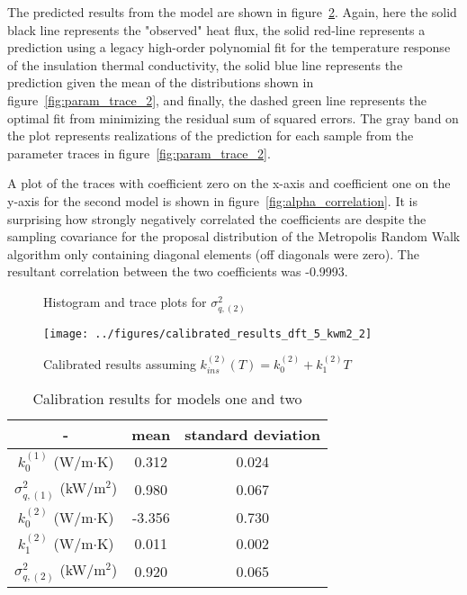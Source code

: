 \documentclass[article]{proc}
\begin{document}
        The predicted results from the model are shown in figure~\ref{fig:cal_results_2}. Again, here the solid black line represents the "observed" heat flux, the solid red-line represents a prediction using a legacy high-order polynomial fit for the temperature response of the insulation thermal conductivity, the solid blue line represents the prediction given the mean of the distributions shown in figure~\ref{fig:param_trace_2}, and finally, the dashed green line represents the optimal fit from minimizing the residual sum of squared errors. The gray band on the plot represents realizations of the prediction for each sample from the parameter traces in figure~\ref{fig:param_trace_2}.

        A plot of the traces with coefficient zero on the x-axis and coefficient one on the y-axis for the second model is shown in figure~\ref{fig:alpha_correlation}. It is surprising how strongly negatively correlated the coefficients are despite the sampling covariance for the proposal distribution of the Metropolis Random Walk algorithm only containing diagonal elements (off diagonals were zero). The resultant correlation between the two coefficients was -0.9993. 

        \begin{figure}[!]
            \centering
            \qquad
            \caption{Histogram and trace plots for $\sigma_{q,(2)}^2$}
            \label{fig:sigma_trace_2}
        \end{figure}

        \begin{figure}[!]
            \centering
            \texttt{[image: ../figures/calibrated\_results\_dft\_5\_kwm2\_2]}
            \caption{Calibrated results assuming $k^{(2)}_{ins}(T) = k^{(2)}_0 + k^{(2)}_1 T$}
            \label{fig:cal_results_2}
        \end{figure}

        \begin{table}[!]
        \centering
        \caption{Calibration results for models one and two}
        \begin{tabular}{ccc}
            \hline
            - & mean & standard deviation \\
            \hline
            $k_0^{(1)}$ (W/m$\cdot$K)       & 0.312     & 0.024 \\
            $\sigma_{q, (1)}^2$ (kW/m$^2$)  & 0.980     & 0.067 \\
            \hline
            $k_0^{(2)}$ (W/m$\cdot$K)       & -3.356    & 0.730 \\
            $k_{1}^{(2)}$ (W/m$\cdot$K)     & 0.011     & 0.002 \\
            $\sigma_{q, (2)}^2$ (kW/m$^2$)  & 0.920     & 0.065 \\
            \hline
        \end{tabular}
        \label{tbl:cal_results}
        \end{table}
\end{document}

